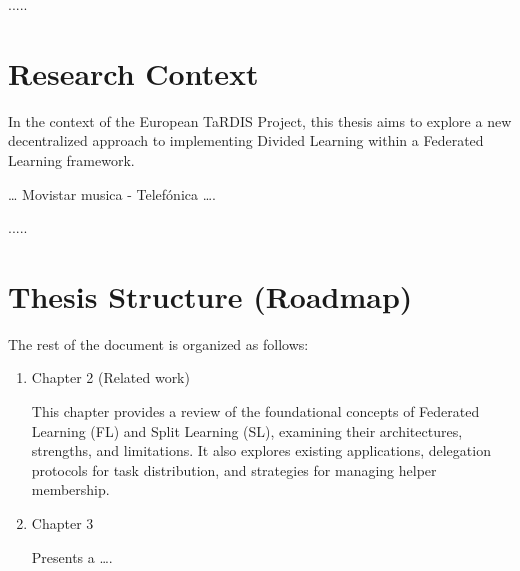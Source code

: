 .....

\section{Research Context}
\label{sub:ResearchContext}

In the context of the European TaRDIS Project, this thesis aims to explore a new decentralized approach to implementing Divided Learning within a Federated Learning framework. 

… Movistar musica - Telefónica ….

.....

\section{Thesis Structure (Roadmap)}
\label{sub:roadMap}

The rest of the document is organized as follows:

\begin{enumerate}

 \item Chapter 2 (Related work)
 
 This chapter provides a review of the foundational concepts of Federated Learning (FL) and Split Learning (SL), examining their architectures, strengths, and limitations. It also explores existing applications, delegation protocols for task distribution, and strategies for managing helper membership.

 \item Chapter 3 
 
 Presents a ….
 

\end{enumerate}


